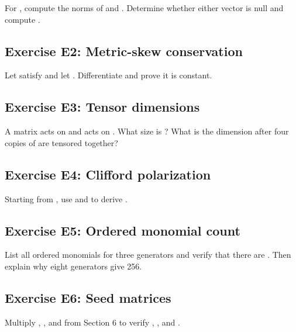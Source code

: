 \documentclass[11pt]{article}
\begin{document}
For \texttt{}, compute the norms of \texttt{} and \texttt{}. Determine whether either vector is null and compute \texttt{}.

\subsection{Exercise E2: Metric-skew conservation}

Let \texttt{} satisfy \texttt{} and let \texttt{}. Differentiate \texttt{} and prove it is constant.

\subsection{Exercise E3: Tensor dimensions}

A matrix \texttt{} acts on \texttt{} and \texttt{} acts on \texttt{}. What size is \texttt{}? What is the dimension after four copies of \texttt{} are tensored together?

\subsection{Exercise E4: Clifford polarization}

Starting from \texttt{}, use \texttt{} and \texttt{} to derive \texttt{}.

\subsection{Exercise E5: Ordered monomial count}

List all ordered monomials for three generators and verify that there are \texttt{}. Then explain why eight generators give 256.

\subsection{Exercise E6: Seed matrices}

Multiply \texttt{}, \texttt{}, and \texttt{} from Section 6 to verify \texttt{}, \texttt{}, and \texttt{}.
\end{document}
